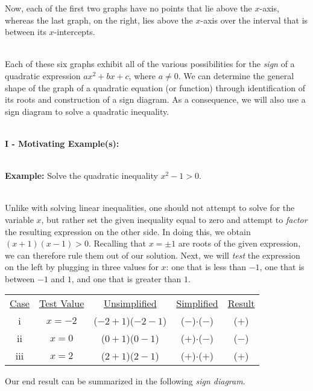 \documentclass[12pt]{article}
\theoremstyle{definition}
\begin{document}
Now, each of the first two graphs have no points that lie above the $x$-axis, whereas the last graph, on the right, lies above the $x$-axis over the interval that is between its $x$-intercepts.\\
\ \par
Each of these six graphs exhibit all of the various possibilities for the {\it sign} of a quadratic expression $ax^2+bx+c$, where $a\neq 0$.  We can determine the general shape of the graph of a quadratic equation (or function) through identification of its roots and construction of a sign diagram.  As a consequence, we will also use a sign diagram to solve a quadratic inequality.\\
\ \par  
{\bf I - Motivating Example(s):}\\
\ \par
{\bf Example:}  Solve the quadratic inequality $x^2-1> 0$.\\
\ \par
Unlike with solving linear inequalities, one should not attempt to solve for the variable $x$, but rather set the given inequality equal to zero and attempt to {\it factor} the resulting expression on the other side.  In doing this, we obtain $(x+1)(x-1)>0$.  Recalling that $x=\pm 1$ are roots of the given expression, we can therefore rule them out of our solution.  Next, we will {\it test} the expression on the left by plugging in three values for $x$: one that is less than $-1$, one that is between $-1$ and $1$, and one that is greater than $1$.
\begin{center}
\begin{tabular}{ccccc}
\underline{Case} & \underline{Test Value} & \underline{Unsimplified} & \underline{Simplified} & \underline{Result}\\
i & $x=-2$ & ($-2+1$)($-2-1$) & ($-$)$\cdot$($-$) & ($+$)\\
ii & $x=0$ & ($0+1$)($0-1$) & ($+$)$\cdot$($-$) & ($-$)\\
iii & $x=2$ & ($2+1$)($2-1$) & ($+$)$\cdot$($+$) & ($+$)
\end{tabular}
\end{center}
Our end result can be summarized in the following {\it sign diagram}.
\end{document}
